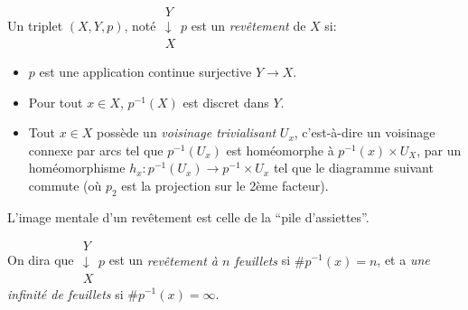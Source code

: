   \begin{defi} 
    Un triplet $(X,Y,p)$, noté $\substack{Y\\\downarrow\\ X}p$ est un \emph{revêtement} de $X$ si: 
    \begin{itemize}
    \item $p$ est une application continue surjective $Y \to X$.
    \item Pour tout $x \in X$, $p^{-1}(X)$ est discret dans $Y$.
    \item Tout $x \in X$ possède un \emph{voisinage trivialisant}  $U_x$,
      c'est-à-dire un voisinage connexe par arcs tel que $p^{-1}(U_x)$ est homéomorphe à $p^{-1}(x) \times
      U_X$, par un homéomorphisme $h_x: p^{-1}(U_x) \to p^{-1} \times U_x$ tel que le diagramme suivant
      commute (où $p_2$ est la projection sur le 2ème facteur).
      \begin{center}
      \end{center}
    \end{itemize}
    L'image mentale d'un revêtement est celle de la ``pile d'assiettes''.

    \begin{center}
    \end{center}

    On dira que $\substack{Y\\\downarrow\\ X}p$ est un \emph{revêtement à $n$ feuillets}  si $\# p^{-1}(x) = n$, et a \emph{une infinité de feuillets} si $\# p^{-1}(x) = \infty$.
  \end{defi}

